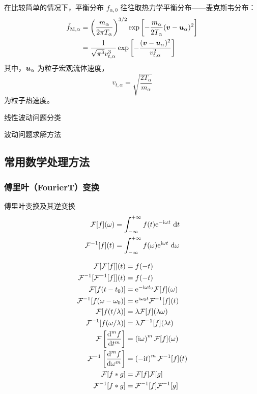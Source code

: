 在比较简单的情况下，平衡分布 $f_{\alpha,0}$ 往往取热力学平衡分布——麦克斯韦分布：
\begin{equation} \label{eq:Maxwell_distribution} \begin{aligned}
\hat{f}_{\text{M}, \alpha}
&= \left(\frac{m_\alpha}{2 \pi T_\alpha}\right)^{3/2}
\exp{\left[- \frac{m_\alpha}{2 T_\alpha} (\bm{v} - \bm{u}_\alpha)^2\right]} \\
&= \frac{1}{\sqrt{\pi^3} v_{t, \alpha}^3}
\exp{\left[- \frac{(\bm{v} - \bm{u}_\alpha)^2}{v_{t, \alpha}^2}\right]}
\end{aligned}\end{equation}
其中，$\bm{u}_\alpha$ 为粒子宏观流体速度，
\begin{equation}
v_{t, \alpha} = \sqrt{\frac{2 T_\alpha}{m_\alpha}}
\end{equation}
为粒子热速度。

线性波动问题分类

波动问题求解方法

\subsection{常用数学处理方法}

\subsubsection{傅里叶（FourierT）变换}

傅里叶变换及其逆变换
\begin{subequations}\begin{align}
\mathcal{F}[f](\omega) &= \int_{-\infty}^{+\infty} f(t) \mathrm{e}^{- \mathrm{i} \omega t} \, \mathop{}\!\mathrm{d} t \\
\mathcal{F}^{-1}[f](t) &= \int_{-\infty}^{+\infty} f(\omega) \mathrm{e}^{\mathrm{i} \omega t} \, \mathop{}\!\mathrm{d} \omega
\end{align}\end{subequations}

\begin{subequations}\begin{align}
\mathcal{F}[\mathcal{F}[f]](t) &= f(-t) \\
\mathcal{F}^{-1}[\mathcal{F}^{-1}[f]](t) &= f(-t) \\
\mathcal{F}[f(t - t_0)] &= \mathrm{e}^{-\mathrm{i} \omega t_0} \mathcal{F}[f](\omega) \\
\mathcal{F}^{-1}[f(\omega - \omega_0)] &= \mathrm{e}^{\mathrm{i} \omega_0 t} \mathcal{F}^{-1}[f](t) \\
\mathcal{F}[f(t / \lambda)] &= \lambda \mathcal{F}[f](\lambda \omega) \\
\mathcal{F}^{-1}[f(\omega / \lambda)] &= \lambda \mathcal{F}^{-1}[f](\lambda t) \\
\mathcal{F}\left[\frac{\mathop{}\!\mathrm{d}^{m} {f}}{\mathop{}\!\mathrm{d} {t}^{m}}\right] &= \left(\mathrm{i}\omega\right)^m \mathcal{F}[f](\omega) \\
\mathcal{F}^{-1}\left[\frac{\mathop{}\!\mathrm{d}^{m} {f}}{\mathop{}\!\mathrm{d} {\omega}^{m}}\right] &= \left(-\mathrm{i} t\right)^m \mathcal{F}^{-1}[f](t) \\
\mathcal{F}[f * g] &= \mathcal{F}[f] \mathcal{F}[g] \\
\mathcal{F}^{-1}[f * g] &= \mathcal{F}^{-1}[f] \mathcal{F}^{-1}[g]
\end{align}\end{subequations}

